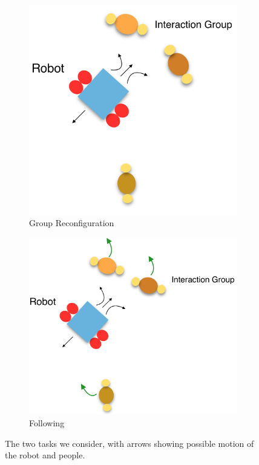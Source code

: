 \documentclass[letterpaper, 10 pt, conference]{ieeeconf}
\begin{document}
	\begin{figure}[tbh]
	\centering
      \begin{subfigure}[b]{0.39\columnwidth}
    \includegraphics[scale = 0.15]{images/static.png}
    \caption{Group Reconfiguration}
    \label{fig:static}
  \end{subfigure}
  \hspace{10mm}
  \begin{subfigure}[b]{0.39\columnwidth}
  \hspace{4mm}
    \includegraphics[scale = 0.15]{images/follow.png}
    \caption{Following}
    \label{fig:follow}
  \end{subfigure} 
  \caption{The two tasks we consider, with arrows showing possible motion of the robot and people.}


\end{figure}
\end{document}
